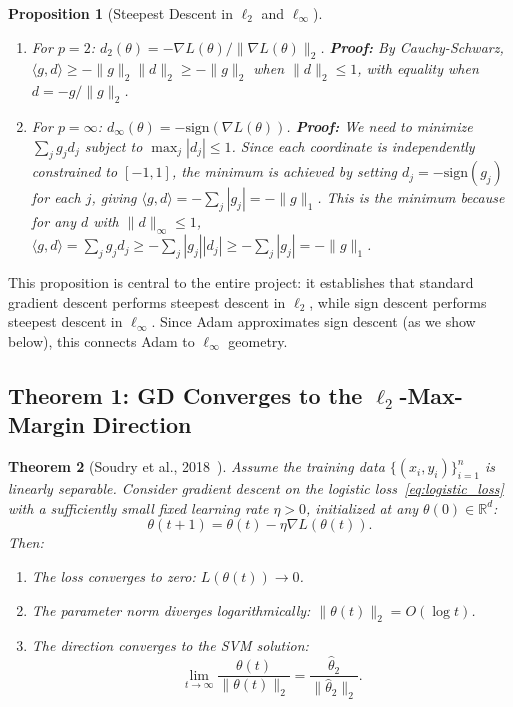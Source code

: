 \documentclass{article}
\newtheorem{theorem}{Theorem}
\newtheorem{proposition}[theorem]{Proposition}
\begin{document}
\begin{proposition}[Steepest Descent in $\ell_2$ and $\ell_\infty$]
\label{prop:steepest}
\begin{enumerate}[leftmargin=*]
    \item For $p = 2$: $d_2(\theta) = -\nabla L(\theta) / \|\nabla L(\theta)\|_2$. \textbf{Proof:} By Cauchy-Schwarz, $\langle g, d \rangle \geq -\|g\|_2 \|d\|_2 \geq -\|g\|_2$ when $\|d\|_2 \leq 1$, with equality when $d = -g/\|g\|_2$.
    
    \item For $p = \infty$: $d_\infty(\theta) = -\text{sign}(\nabla L(\theta))$. \textbf{Proof:} We need to minimize $\sum_j g_j d_j$ subject to $\max_j |d_j| \leq 1$. Since each coordinate is independently constrained to $[-1, 1]$, the minimum is achieved by setting $d_j = -\text{sign}(g_j)$ for each $j$, giving $\langle g, d \rangle = -\sum_j |g_j| = -\|g\|_1$. This is the minimum because for any $d$ with $\|d\|_\infty \leq 1$, $\langle g, d \rangle = \sum_j g_j d_j \geq -\sum_j |g_j||d_j| \geq -\sum_j |g_j| = -\|g\|_1$.
\end{enumerate}
\end{proposition}

This proposition is central to the entire project: it establishes that standard gradient descent performs steepest descent in $\ell_2$, while sign descent performs steepest descent in $\ell_\infty$. Since Adam approximates sign descent (as we show below), this connects Adam to $\ell_\infty$ geometry.

\subsection{Theorem 1: GD Converges to the $\ell_2$-Max-Margin Direction}
\label{sec:soudry}

\begin{theorem}[Soudry et al., 2018~\cite{soudry2018}]
\label{thm:soudry}
Assume the training data $\{(x_i, y_i)\}_{i=1}^n$ is linearly separable. Consider gradient descent on the logistic loss~\eqref{eq:logistic_loss} with a sufficiently small fixed learning rate $\eta > 0$, initialized at any $\theta(0) \in \mathbb{R}^d$:
\begin{equation}
    \theta(t+1) = \theta(t) - \eta \nabla L(\theta(t)).
\end{equation}
Then:
\begin{enumerate}
    \item The loss converges to zero: $L(\theta(t)) \to 0$.
    \item The parameter norm diverges logarithmically: $\|\theta(t)\|_2 = O(\log t)$.
    \item The direction converges to the SVM solution:
    \begin{equation}
        \lim_{t \to \infty} \frac{\theta(t)}{\|\theta(t)\|_2} = \frac{\hat{\theta}_2}{\|\hat{\theta}_2\|_2}.
    \end{equation}
\end{enumerate}
\end{theorem}
\end{document}
